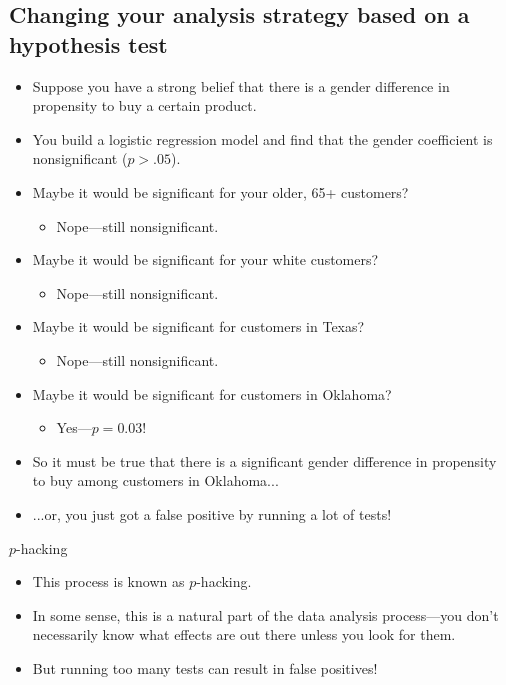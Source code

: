 \documentclass{beamer}\usepackage[]{graphicx}\usepackage[]{color}
\begin{document}
\begin{darkframes}
    \section{Changing your analysis strategy based on a hypothesis test}

    \begin{frame}
      \begin{itemize}[<+->]
        \item Suppose you have a strong belief that there is a gender difference in propensity to buy a certain product.
        \item You build a logistic regression model and find that the gender coefficient is nonsignificant ($p>.05$).
        \item Maybe it would be significant for your older, 65+ customers?
          \begin{itemize} \item Nope---still nonsignificant. \end{itemize}
        \item Maybe it would be significant for your white customers?
          \begin{itemize} \item Nope---still nonsignificant. \end{itemize}
        \item Maybe it would be significant for customers in Texas?
          \begin{itemize} \item Nope---still nonsignificant. \end{itemize}
        \item Maybe it would be significant for customers in Oklahoma?
          \begin{itemize} \item Yes---$p=0.03$! \end{itemize}
        \item So it must be true that there is a significant gender difference in propensity to buy among customers in Oklahoma...
        \item ...or, you just got a false positive by running a lot of tests!
      \end{itemize}
    \end{frame}

    \begin{frame}{$p$-hacking}
      \begin{itemize}[<+->]
        \item This process is known as \alert{$p$-hacking}.
        \item In some sense, this is a natural part of the data analysis process---you don't necessarily know what effects are out there unless you look for them.
        \item But running too many tests can result in false positives!
      \end{itemize}
    \end{frame}


\end{darkframes}
\end{document}
